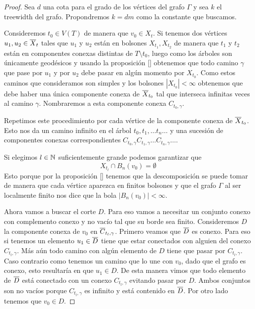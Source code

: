 \documentclass[tesis.tex]{subfiles}
\begin{document}
\begin{proof}
	Sea $d$ una cota para el grado de los vértices del grafo $\Gamma$ y sea $k$ el treewidth del grafo.
	Propondremos $k = dm$ como la constante que buscamos.
	
	Consideremos $t_0 \in V(T)$ de manera que $v_0 \in X_t$.
	Si tenemos dos vértices $u_1,u_2 \in \overline X_t$ tales que $u_1$ y $u_2$ están en bolsones $X_{t_1}, X_{t_2}$ de manera que $t_1$ y $t_2$ están en componentes conexas distintas de $T \setminus t_0$, luego como los árboles son únicamente geodésicos y usando la proposición \ref{} obtenemos que todo camino $\gamma$ que pase por $u_1$ y por $u_2$ debe pasar en algún momento por $X_{{t}_0}$.
	Como estos caminos que consideramos son simples y los bolsones $|X_{t_0}| < \infty$ obtenemos que debe haber una única componente conexa de $\overline X_{t_0}$ tal que interseca infinitas veces al camino $\gamma$.
	Nombraremos a esta componente conexa $C_{t_0,\gamma}$.
	
	Repetimos este procedimiento por cada vértice de la componente conexa de $\overline X_{t_0}$.
	Esto nos da un camino infinito en el árbol $t_0,t_1, \dots t_n \dots$ y una sucesión de componentes conexas correspondientes $C_{t_0,\gamma} C_{t_1,\gamma} \dots C_{t_n, \gamma} \dots$.
	
	Si elegimos $l \in \mathbb{N}$ suficientemente grande podemos garantizar que
	\[
		X_{t_l} \cap B_n(v_0) = \emptyset
	\]
	Esto porque por la proposición \ref{} tenemos que la descomposición se puede tomar de manera que cada vértice aparezca en finitos bolsones y que el grafo $\Gamma$ al ser localmente finito nos dice que la bola $|B_n(v_0)| < \infty$.
	
	Ahora vamos a buscar el corte $D$. 
	Para eso vamos a necesitar un conjunto conexo con complemento conexo y no vacío tal que su borde sea finito.
	Consideremos $D$ la componente conexa de $v_0$ en $\overline C_{t_l, \gamma}$.
	Primero veamos que $\overline D$ es conexo.
	Para eso si tenemos un elemento $u_1 \in \overline D$ tiene que estar conectados con alguien del conexo $C_{t_l, \gamma}$.
	Más aún todo camino con algún elemento de $D$ tiene que pasar por $C_{t_l, \gamma}$.
	Caso contrario como tenemos un camino que lo une con $v_0$, dado que el grafo es conexo, esto resultaría en que $u_1 \in D$.
	De esta manera vimos que todo elemento de $\overline D$ está conectado con un conexo $C_{t_l, \gamma}$ evitando pasar por $D$.
	Ambos conjuntos son no vacíos porque $C_{t_l, \gamma}$ es infinito y está contenido en $\overline D$.
	Por otro lado tenemos que $v_0 \in D$.
	

\end{proof}
\end{document}
